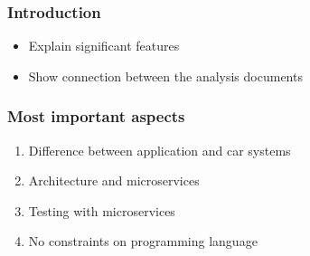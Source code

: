 \begin{frame}[t,plain]
    \titlepage
\end{frame}

\begin{frame}
    \frametitle{Introduction}
    \begin{itemize}
        \item Explain significant features
            \pause
        \item Show connection between the analysis documents
    \end{itemize}
\end{frame}

\begin{frame}
	\frametitle{Most important aspects}
	\begin{enumerate}
		\item Difference between application and car systems
		\pause
		\item Architecture and microservices
		\pause
		\item Testing with microservices
		\pause
		\item No constraints on programming language
	\end{enumerate}
\end{frame}
